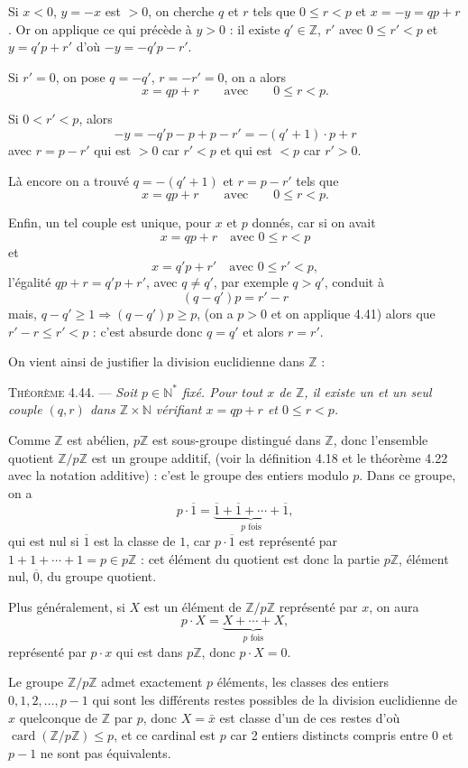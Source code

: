 Si $x<0$, $y=-x$ est $>0$, on cherche $q$ et $r$ tels que $0\le r<p$ et $x=-y=qp+r$. Or on applique ce qui précède à $y>0$ : il existe $q'\in\mathbb Z$, $r'$ avec $0\le r'<p$ et $y=q'p+r'$ d'où $-y=-q'p-r'$.

Si $r'=0$, on pose $q=-q'$, $r=-r'=0$, on a alors
\[
x=qp+r\qquad\text{avec}\qquad0\le r<p.
\]

Si $0<r'<p$, alors
\[
-y=-q'p-p+p-r'=-(q'+1)\cdot p+r
\]
avec $r=p-r'$ qui est $>0$ car $r'<p$ et qui est $<p$ car $r'>0$.

Là encore on a trouvé $q=-(q'+1)$ et $r=p-r'$ tels que
\[
x=qp+r\qquad\text{avec}\qquad0\le r<p.
\]

Enfin, un tel couple est unique, pour $x$ et $p$ donnés, car si on avait
\[
x=qp+r\quad\text{avec }0\le r<p
\]
et
\[
x=q'p+r'\quad\text{avec }0\le r'<p,
\]
l'égalité $qp+r=q'p+r'$, avec $q\ne q'$, par exemple $q>q'$, conduit à
\[
(q-q')p=r'-r
\]
mais, $q-q'\ge1\Rightarrow(q-q')p\ge p$, (on a $p>0$ et on applique 4.41) alors que $r'-r\le r'<p$ : c'est absurde donc $q=q'$ et alors $r=r'$.

On vient ainsi de justifier la division euclidienne dans $\mathbb Z$ :

\medskip\noindent\textsc{Théorème 4.44.} --- \emph{Soit $p\in\mathbb N^*$ fixé. Pour tout $x$ de $\mathbb Z$, il existe un et un seul couple $(q,r)$ dans $\mathbb Z\times\mathbb N$ vérifiant $x=qp+r$ et $0\le r<p$.}

Comme $\mathbb Z$ est abélien, $p\mathbb Z$ est sous-groupe distingué dans $\mathbb Z$, donc l'ensemble quotient $\mathbb Z/p\mathbb Z$ est un groupe additif, (voir la définition 4.18 et le théorème 4.22 avec la notation additive) : c'est le groupe des entiers modulo $p$. Dans ce groupe, on a
\[
p\cdot\overline1=\underbrace{\overline1+\overline1+\cdots+\overline1}_{p\text{ fois}},
\]
qui est nul si $\overline1$ est la classe de $1$, car $p\cdot\overline1$ est représenté par $1+1+\cdots+1=p\in p\mathbb Z$ : cet élément du quotient est donc la partie $p\mathbb Z$, élément nul, $\overline0$, du groupe quotient.

Plus généralement, si $X$ est un élément de $\mathbb Z/p\mathbb Z$ représenté par $x$, on aura
\[
p\cdot X=\underbrace{X+\cdots+X}_{p\text{ fois}},
\]
représenté par $p\cdot x$ qui est dans $p\mathbb Z$, donc $p\cdot X=0$.

Le groupe $\mathbb Z/p\mathbb Z$ admet exactement $p$ éléments, les classes des entiers $0,1,2,\ldots,p-1$ qui sont les différents restes possibles de la division euclidienne de $x$ quelconque de $\mathbb Z$ par $p$, donc $X=\bar x$ est classe d'un de ces restes d'où $\operatorname{card}(\mathbb Z/p\mathbb Z)\le p$, et ce cardinal est $p$ car 2 entiers distincts compris entre $0$ et $p-1$ ne sont pas équivalents.

